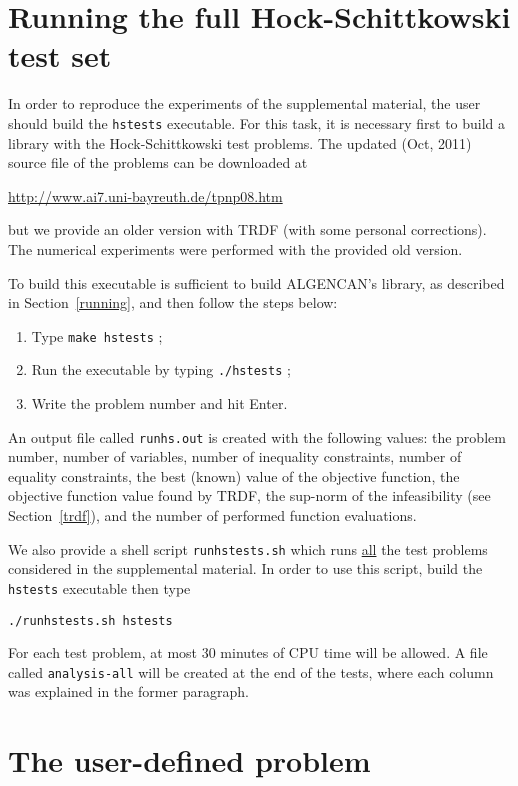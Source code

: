 \documentclass[12pt]{article}
\begin{document}
\section{Running the full Hock-Schittkowski test set}
\label{hs}

In order to reproduce the experiments of the supplemental material,
the user should build the \texttt{hstests} executable. For this task,
it is necessary first to build a library with the Hock-Schittkowski
test problems. The updated (Oct, 2011) source file of the problems can
be downloaded at
\begin{center}
\url{http://www.ai7.uni-bayreuth.de/tpnp08.htm}
\end{center}
but we provide an older version with TRDF (with some personal
corrections). The numerical experiments were performed with the
provided old version.

To build this executable is sufficient to build ALGENCAN's library, as
described in Section~\ref{running}, and then follow the steps below:
\begin{enumerate}
\item Type \texttt{make hstests} ;
\item Run the executable by typing \texttt{./hstests} ;
\item Write the problem number and hit Enter.
\end{enumerate}

An output file called \texttt{runhs.out} is created with the following
values: the problem number, number of variables, number of inequality
constraints, number of equality constraints, the best (known) value of
the objective function, the objective function value found by TRDF,
the sup-norm of the infeasibility (see Section~\ref{trdf}), and the
number of performed function evaluations.

We also provide a shell script \texttt{runhstests.sh} which runs
\underline{all} the test problems considered in the supplemental
material. In order to use this script, build the \texttt{hstests}
executable then type
\begin{verbatim}
./runhstests.sh hstests
\end{verbatim}
For each test problem, at most 30 minutes of CPU time will be
allowed. A file called \texttt{analysis-all} will be created at the
end of the tests, where each column was explained in the former
paragraph.


\section{The user-defined problem}
\label{user}
\end{document}
